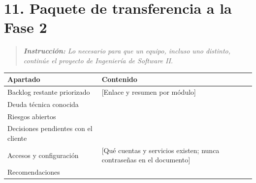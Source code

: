 \section{11. Paquete de transferencia a la Fase
2}\label{paquete-de-transferencia-a-la-fase-2}

\begin{quote}
\emph{\textbf{Instrucción:} Lo necesario para que un equipo, incluso uno
distinto, continúe el proyecto de Ingeniería de Software II.}
\end{quote}

{\def\LTcaptype{none} %
\begin{longtable}[]{@{}
  >{\raggedright\arraybackslash}p{}
  >{\raggedright\arraybackslash}p{}@{}}
\toprule\noalign{}
\begin{minipage}[b]{\linewidth}\raggedright
\textbf{Apartado}
\end{minipage} & \begin{minipage}[b]{\linewidth}\raggedright
\textbf{Contenido}
\end{minipage} \\
\midrule\noalign{}
\endhead
\bottomrule\noalign{}
\endlastfoot
Backlog restante priorizado & {[}Enlace y resumen por módulo{]} \\
Deuda técnica conocida & \\
Riesgos abiertos & \\
Decisiones pendientes con el cliente & \\
Accesos y configuración & {[}Qué cuentas y servicios existen; nunca
contraseñas en el documento{]} \\
Recomendaciones & \\
\end{longtable}
}
